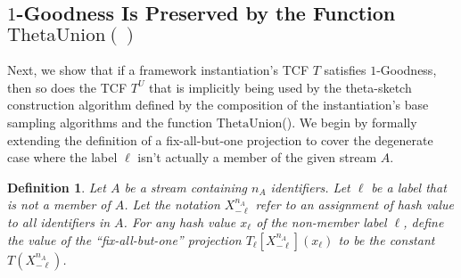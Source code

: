 \documentclass{article}
\newcommand{\xnml}{X^{n_A}_{-\ell}}
\newtheorem{definition}[theorem]{Definition}
\newcommand{\thetaunion}{\mathrm{ThetaUnion}}
\begin{document}
\subsection{$1$-Goodness Is Preserved by the Function $\thetaunion()$}\label{sec:union-sat}
Next, we show that if a framework instantiation's TCF $T$ satisfies $1$-Goodness, 
then so does the TCF $T^U$ that is implicitly being used by the theta-sketch construction 
algorithm defined by the composition of the instantiation's base sampling algorithms and the function $\thetaunion$().
We begin by formally extending the definition of a fix-all-but-one projection to cover 
the degenerate case where the label $\ell$ isn't actually a member of the given stream $A$.

\begin{definition}\label{def:extended-projection}
Let $A$ be a stream containing $n_A$ identifiers. Let $\ell$ be a label that is {\em not} a member of $A$. 
Let the notation $\xnml$ refer to an assignment of hash value to {\em all} identifiers in $A$.
For any hash value $x_\ell$ of the non-member label $\ell$,
define the value of the ``fix-all-but-one'' projection
$T_\ell[\xnml](x_\ell)$ to be the constant $T(\xnml)$.
\end{definition}
\end{document}
